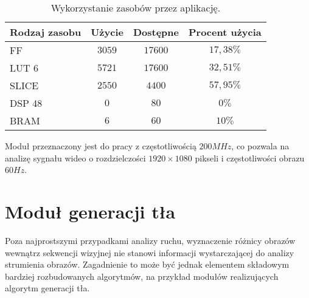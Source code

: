 \begin{table}[h]
	\caption{Wykorzystanie zasobów przez aplikację.}
	\centering
	\label{tab;frame-difference-utilization}
	\begin{tabular}{|l|c|c|c|}
		\hline
		\textbf{Rodzaj zasobu} & \textbf{Użycie} & \textbf{Dostępne} & \textbf{Procent użycia}      \\ \hline
		FF                     & $3059$            & $17600$             & $17,38\%$                 \\ \hline
		LUT 6                  & $5721$            & $17600$             & $32,51\%$                 \\ \hline
		SLICE                  & $2550$            & $4400$             & $57,95\%$                 \\ \hline
		DSP 48                 & $0$               & $80$                & $0\%$                    \\ \hline
		BRAM                   & $6$               & $60$                & $10\%$                   \\ \hline
	\end{tabular}
\end{table}

Moduł przeznaczony jest do pracy z częstotliwością $200MHz$, co pozwala na analizę sygnału wideo o rozdzielczości $1920 \times 1080$ pikseli i częstotliwości obrazu $60Hz$.

\section{Moduł generacji tła}
Poza najprostszymi przypadkami analizy ruchu, wyznaczenie różnicy obrazów wewnątrz sekwencji wizyjnej nie stanowi informacji wystarczającej do analizy strumienia obrazów. Zagadnienie to może być jednak elementem składowym bardziej rozbudowanych algorytmów, na przykład modułów realizujących algorytm generacji tła.

